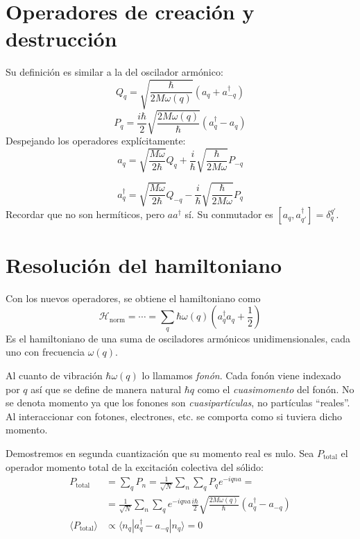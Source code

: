 \section*{Operadores de creación y destrucción}
Su definición es similar a la del oscilador armónico:
\begin{equation}
  Q_q = \sqrt{\frac{\hbar}{2M\omega (q)}} (a_q + a^\dagger_{-q})
\end{equation}
\begin{equation}
  P_q = \frac{i\hbar}{2} \sqrt{ \frac{2M \omega (q)}{\hbar} }
  (a_q^\dagger - a_q)
\end{equation}
Despejando los operadores explícitamente:
\begin{equation}
  a_q = \sqrt{\frac{M\omega}{2\hbar}}Q_q + \frac{i}{\hbar}
  \sqrt{\frac{\hbar}{2M\omega}} P_{-q}
\end{equation}

\begin{equation}
  a^\dagger_q = \sqrt{\frac{M\omega}{2\hbar}}Q_{-q} - \frac{i}{\hbar}
  \sqrt{\frac{\hbar}{2M\omega}} P_{q}
\end{equation}
Recordar que no son hermíticos, pero $aa^\dagger$ sí. Su conmutador es
$[a_q,a_{q'}^\dagger] = \delta_q^{q'}$.


\section*{Resolución del hamiltoniano}
Con los nuevos operadores, se obtiene el hamiltoniano como
\begin{equation}
  \mathcal{H}_\text{norm} = \cdots = \sum_{q}^{ } \hbar \omega(q)
  \left( a_q^\dagger a_q + \frac{1}{2} \right)
\end{equation}
Es el hamiltoniano de una suma de osciladores armónicos
unidimensionales, cada uno con frecuencia $\omega(q)$.

Al cuanto de vibración $\hbar \omega(q)$ lo llamamos
\emph{fonón}. Cada fonón viene indexado por $q$ así que se define de
manera natural $\hbar q$ como el \emph{cuasimomento} del fonón. No se
denota momento ya que los fonones son \emph{cuasipartículas}, no
partículas ``reales''. Al interaccionar con fotones, electrones,
etc. se comporta como si tuviera dicho momento.

Demostremos en segunda cuantización que su momento real es nulo. Sea
$P_\text{total}$ el operador momento total de la excitación colectiva
del sólido:
\begin{equation}
\begin{split}
  P_\text{total} &= \sum_{q}^{ } P_n = \frac{1}{\sqrt N} \sum_{n}^{ }
  \sum_{q}^{ } P_q e^{-iqna} =  \\ &= \frac{1}{\sqrt N} \sum_{n}^{ }
  \sum_{q}^{ } e^{-iqna} \frac{i\hbar}{2} \sqrt{ \frac{2M \omega
      (q)}{\hbar}} (a_q^\dagger - a_{-q}) \\
  \langle P_\text{total} \rangle &\propto \langle n_q | a_q^\dagger - a_{-q} |n_q  \rangle = 0
\end{split}
\end{equation}
